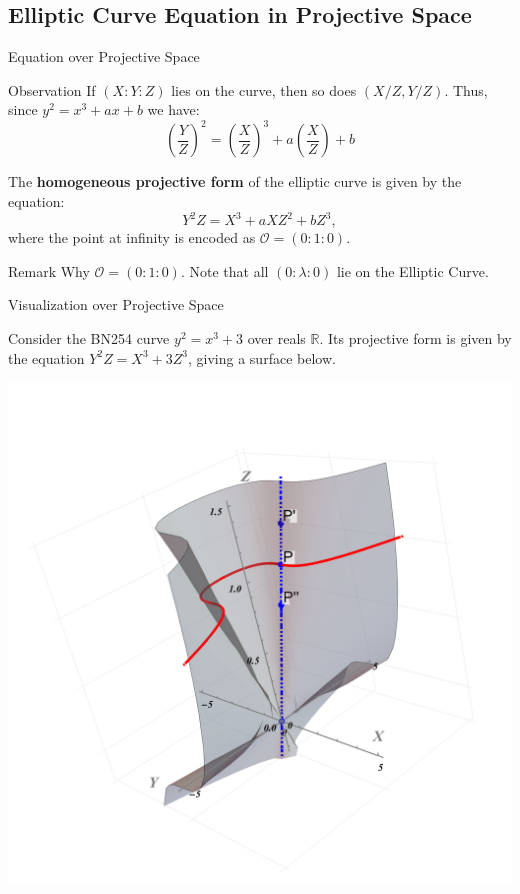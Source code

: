 \documentclass[xcolor={usenames,dvipsnames}]{beamer}
\begin{document}
    \subsection{Elliptic Curve Equation in Projective Space}
    \begin{frame}{Equation over Projective Space}
        \begin{block}{Observation}
            If $(X:Y:Z)$ lies on the curve, then so does $(X/Z,Y/Z)$.  Thus, since $y^2=x^3+ax+b$ we have:
            \begin{equation*}
                \left(\frac{Y}{Z}\right)^2 = \left(\frac{X}{Z}\right)^3 + a\left(\frac{X}{Z}\right) + b
            \end{equation*}
        \end{block}

        \begin{definition}
            The \textbf{homogeneous projective form} of the elliptic curve is given by the equation:
            \begin{equation*}
                Y^2Z = X^3 + aXZ^2 + bZ^3,
            \end{equation*}
            where the point at infinity is encoded as $\mathcal{O} = (0:1:0)$.
        \end{definition}

        \begin{block}{Remark}
            Why $\mathcal{O} = (0:1:0)$. Note that all $(0:\lambda:0)$ lie on the Elliptic Curve.
        \end{block}
    \end{frame}

    \begin{frame}{Visualization over Projective Space}
        \begin{example}
            Consider the BN254 curve $y^2 = x^3 + 3$ over reals $\mathbb{R}$. Its projective form is given by the equation $Y^2Z = X^3 + 3Z^3$, giving a surface below.
            \begin{center}
                \includegraphics[trim={275 100 225 100}, width=0.3\linewidth, clip]{images/lecture_4/projective_ec.pdf}        
            \end{center}
        \end{example}
    \end{frame}
\end{document}
